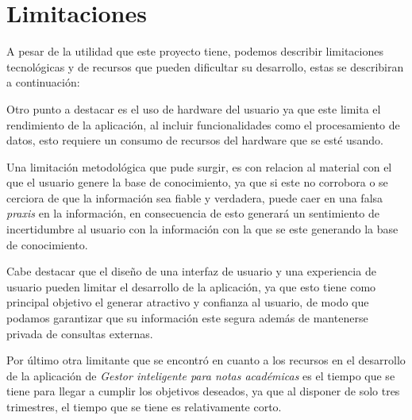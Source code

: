 \section{Limitaciones}
\noindent A pesar de la utilidad que este proyecto tiene, podemos describir limitaciones tecnológicas y de recursos que pueden dificultar su desarrollo, estas se describiran a continuación:

\vspace{.5cm}

Otro punto a destacar es el uso de hardware del usuario ya que este limita el rendimiento de la aplicación, al incluir funcionalidades como el procesamiento de datos, esto requiere un consumo de recursos del hardware que se esté usando.

\vspace{.5cm}

Una limitación metodológica que pude surgir, es con relacion al material con el que el usuario genere la base de conocimiento, ya que si este no corrobora o se cerciora de que la información sea fiable y verdadera, puede caer en una falsa \textit{praxis} en la información, en consecuencia de esto generará un sentimiento de incertidumbre al usuario con la información con la que se este generando la base de conocimiento.

\vspace{.5cm}

Cabe destacar que el diseño de una interfaz de usuario y una experiencia de usuario pueden limitar el desarrollo de la aplicación, ya que esto tiene como principal objetivo el generar atractivo y confianza al usuario, de modo que podamos garantizar que su información este segura además de mantenerse privada de consultas externas.

\vspace{.5cm}

Por último otra limitante que se encontró en cuanto a los recursos en el desarrollo de la aplicación de \emph{Gestor inteligente para notas académicas} es el tiempo que se tiene para llegar a cumplir los objetivos deseados, ya que al disponer de solo tres trimestres, el tiempo que se tiene es relativamente corto.
